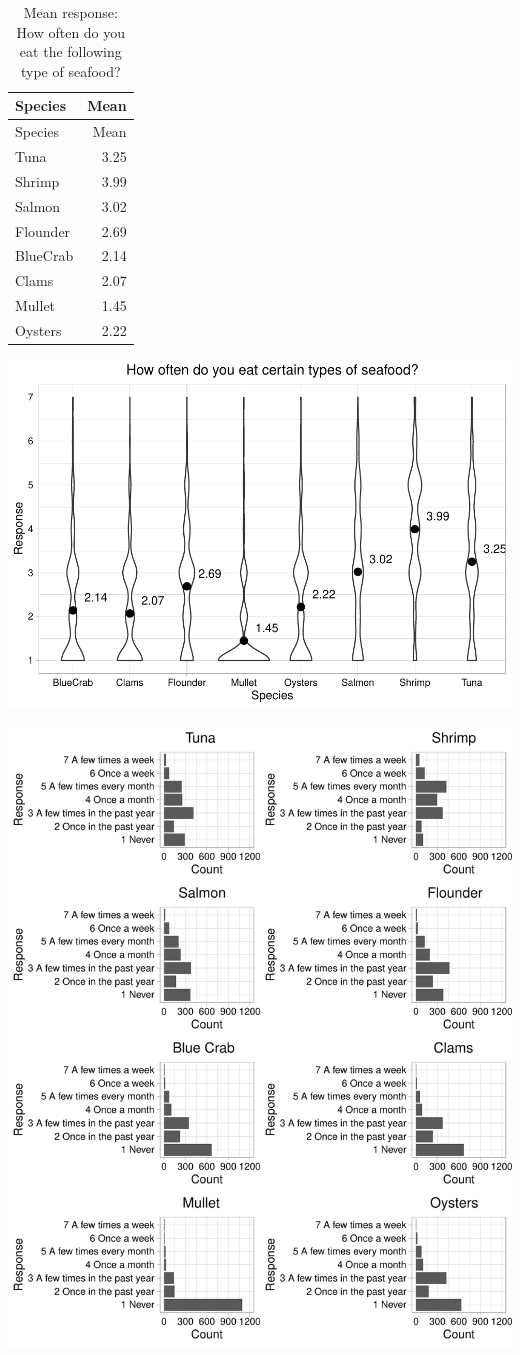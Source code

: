 \documentclass[
  12pt,
]{article}
\begin{document}
\begin{longtable}[]{@{}lr@{}}
\caption{Mean response: How often do you eat the following type of
seafood?}\tabularnewline
\toprule
Species & Mean\tabularnewline
\midrule
\endfirsthead
\toprule
Species & Mean\tabularnewline
\midrule
\endhead
Tuna & 3.25\tabularnewline
Shrimp & 3.99\tabularnewline
Salmon & 3.02\tabularnewline
Flounder & 2.69\tabularnewline
BlueCrab & 2.14\tabularnewline
Clams & 2.07\tabularnewline
Mullet & 1.45\tabularnewline
Oysters & 2.22\tabularnewline
\bottomrule
\end{longtable}

\includegraphics{Final_rmd_files/figure-latex/freq violin-1.pdf}

\includegraphics{Final_rmd_files/figure-latex/frequency-1.pdf}
\end{document}
